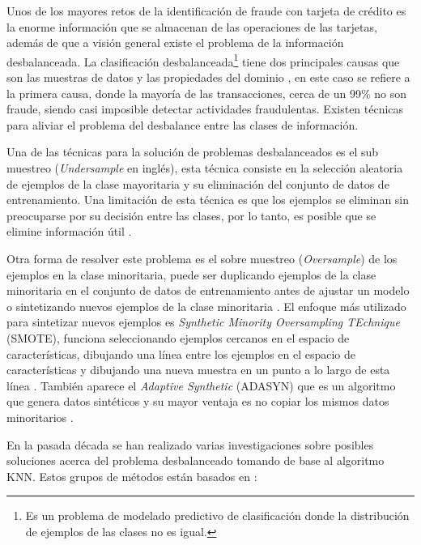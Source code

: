   Unos de los mayores retos de la identificaci\'{o}n de fraude con tarjeta de cr\'{e}dito es la enorme informaci\'{o}n que se almacenan de las operaciones de las tarjetas, adem\'{a}s de que a visi\'{o}n general existe el problema de la informaci\'{o}n desbalanceada. La clasificaci\'{o}n desbalanceada\footnote{Es un problema de modelado predictivo de clasificaci\'{o}n donde la distribuci\'{o}n de ejemplos de las clases no es igual.} tiene dos principales causas que son las muestras de datos y las propiedades del dominio \cite{7}, en este caso se refiere a la primera causa, donde la mayoría de las transacciones, cerca de un 99\% no son fraude, siendo casi imposible detectar actividades fraudulentas. Existen t\'{e}cnicas para aliviar el problema del desbalance entre las clases de informaci\'{o}n.
  
  Una de las t\'{e}cnicas para la soluci\'{o}n de problemas desbalanceados es el sub muestreo (\textit{Undersample} en ingl\'{e}s), esta t\'{e}cnica consiste en la selecci\'{o}n aleatoria de ejemplos de la clase mayoritaria y su eliminaci\'{o}n del conjunto de datos de entrenamiento. Una limitaci\'{o}n de esta t\'{e}cnica es que los ejemplos se eliminan sin preocuparse por su decisi\'{o}n entre las clases, por lo tanto, es posible que se elimine informaci\'{o}n \'{u}til \cite{8}.
  
  Otra forma de resolver este problema es el sobre muestreo (\textit{Oversample}) de los ejemplos en la clase minoritaria, puede ser duplicando ejemplos de la clase minoritaria en el conjunto de datos de entrenamiento antes de ajustar un modelo o sintetizando nuevos ejemplos de la clase minoritaria \cite{9}. El enfoque más utilizado para sintetizar nuevos ejemplos es \textit{Synthetic Minority Oversampling TEchnique} (SMOTE), funciona seleccionando ejemplos cercanos en el espacio de caracter\'{i}sticas, dibujando una l\'{i}nea entre los ejemplos en el espacio de caracter\'{i}sticas y dibujando una nueva muestra en un punto a lo largo de esta l\'{i}nea \cite{10}. Tambi\'{e}n aparece el \textit{Adaptive Synthetic} (ADASYN) que es un algoritmo que genera datos sint\'{e}ticos y su mayor ventaja es no copiar los mismos datos minoritarios \cite{11}.
  
  En la pasada d\'{e}cada se han realizado varias investigaciones sobre posibles soluciones acerca del problema desbalanceado tomando de base al algoritmo KNN. Estos grupos de m\'{e}todos est\'{a}n basados en \cite{12}:
  
